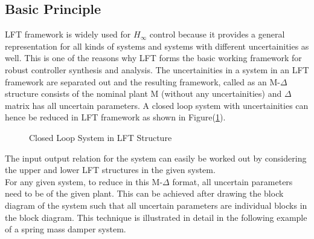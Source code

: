 \documentclass[a4paper,12pt]{article}
\begin{document}
		\subsection{Basic Principle} LFT framework is widely used for $H_{\infty}$ control because it provides a general representation for all kinds of systems and systems with different uncertainities as well. This is one of the reasons why LFT forms the basic working framework for robust controller synthesis and analysis. The uncertainities in a system  in an LFT framework are separated out and the resulting framework, called as an M-$\Delta$ structure consists of the nominal plant M (without any uncertainities) and $\Delta$ matrix has all uncertain parameters. A closed loop system with uncertainities can hence be reduced in LFT framework as shown in Figure(\ref{cllft}). 
		\begin{figure}[H]
 
			  \centering
			  
			  
			  \caption{Closed Loop System in LFT Structure}
			 \label{cllft}
		\end{figure}
		The input output relation for the system can easily be worked out by considering the upper and lower LFT structures in the given system. \\For any given system, to reduce in this M-$\Delta$ format, all uncertain parameters need to be  of the given plant. This can be achieved after drawing the block diagram of the system such that all uncertain parameters are individual  blocks in the block diagram. This technique is illustrated in detail in the following example of a spring mass damper system. 
\end{document}
